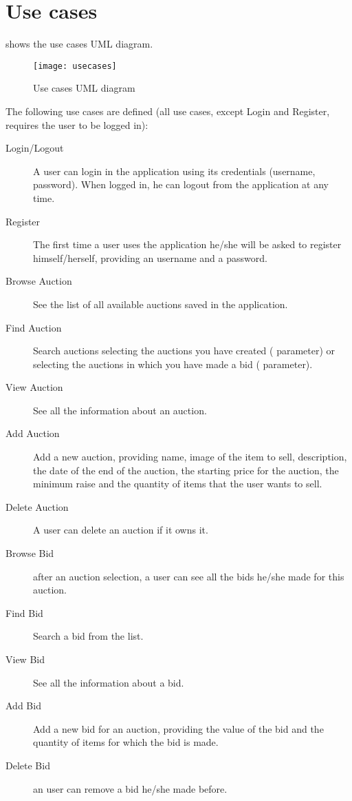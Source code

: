 \chapter{Use cases}\label{ch:usecases}

 shows the use cases UML diagram.

\begin{figure}[htb]
	\centering
	\texttt{[image: usecases]}
	\caption{Use cases UML diagram}\label{fig:usecases}
\end{figure}

The following use cases are defined (all use cases, except Login and Register,
requires the user to be logged in):
\begin{description}
	\item[Login/Logout] A user can login in the application using its
		credentials (username, password). When logged in, he can logout
		from the application at any time.
	\item[Register] The first time a user uses the application he/she will
		be asked to register himself/herself, providing an username and
		a password.
	\item[Browse Auction] See the list of all available auctions saved in
		the application.
	\item[Find Auction] Search auctions selecting the auctions you have
		created ( parameter) or selecting the auctions
		in which you have made a bid ( parameter).
	\item[View Auction] See all the information about an auction.
	\item[Add Auction] Add a new auction, providing name, image of the item
		to sell, description, the date of the end of the auction, the
		starting price for the auction, the minimum raise and the
		quantity of items that the user wants to sell.
	\item[Delete Auction] A user can delete an auction if it owns it.
	\item[Browse Bid] after an auction selection, a user can see all the
		bids he/she made for this auction.
	\item[Find Bid] Search a bid from the list.
	\item[View Bid] See all the information about a bid.
	\item[Add Bid] Add a new bid for an auction, providing the value of the
		bid and the quantity of items for which the bid is made.
	\item[Delete Bid] an user can remove a bid he/she made before.
\end{description}
